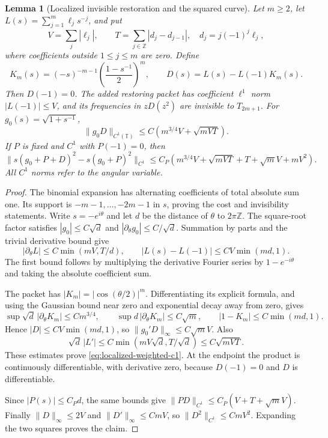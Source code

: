 \documentclass[11pt]{article}
\newtheorem{lemma}[proposition]{Lemma}
\newcommand{\T}{\mathbb T}
\begin{document}
\begin{lemma}[Localized invisible restoration and the squared curve]
\label{lem:localized-restoration}
Let $m\ge2$, let $L(s)=\sum_{j=1}^m\ell_js^{-j}$, and put
\[
 V=\sum_j|\ell_j|,\qquad
 T=\sum_{j\in\mathbb Z}|d_j-d_{j-1}|,
 \quad d_j=j(-1)^j\ell_j,
\]
where coefficients outside $1\le j\le m$ are zero. Define
\[
 K_m(s)=(-s)^{-m-1}\left(\frac{1-s^{-1}}2\right)^m,
 \qquad D(s)=L(s)-L(-1)K_m(s).
\]
Then $D(-1)=0$. The added restoring packet has coefficient
$\ell^1$ norm $|L(-1)|\le V$, and its frequencies in $zD(z^2)$
are invisible to $T_{2m+1}$. For $g_0(s)=\sqrt{1+s^{-1}}$,
\begin{equation}\label{eq:localized-weighted-c1}
 \|g_0D\|_{C^1(\T)}
 \le C\left(m^{3/4}V+\sqrt{mVT}\right).
\end{equation}
If $P$ is fixed and $C^1$ with $P(-1)=0$, then
\[
 \|s(g_0+P+D)^2-s(g_0+P)^2\|_{C^1}
 \le C_P\left(m^{3/4}V+\sqrt{mVT}+T+\sqrt m V+mV^2\right).
\]
All $C^1$ norms refer to the angular variable.
\end{lemma}
\begin{proof}
The binomial expansion has alternating coefficients of total absolute
sum one. Its support is $-m-1,\ldots,-2m-1$ in $s$, proving the
cost and invisibility statements.
Write $s=-e^{i\theta}$ and let $d$ be the distance of $\theta$ to
$2\pi\mathbb Z$. The square-root factor satisfies
$|g_0|\le C\sqrt d$ and $|\partial_\theta g_0|\le C/\sqrt d$.
Summation by parts and the trivial derivative bound give
\[
 |\partial_\theta L|\le C\min(mV,T/d),\qquad
 |L(s)-L(-1)|\le CV\min(md,1).
\]
The first bound follows by multiplying the derivative Fourier series
by $1-e^{-i\theta}$ and taking the absolute coefficient sum.

The packet has $|K_m|=|\cos(\theta/2)|^m$. Differentiating its explicit
formula, and using the Gaussian bound near zero and exponential decay
away from zero, gives
\[
 \sup\sqrt d\,|\partial_\theta K_m|\le Cm^{3/4},\qquad
 \sup d\,|\partial_\theta K_m|\le C\sqrt m,
 \qquad |1-K_m|\le C\min(md,1).
\]
Hence $|D|\le CV\min(md,1)$, so
$\|g_0'D\|_\infty\le C\sqrt m V$. Also
\[
 \sqrt d\,|L'|\le C\min(mV\sqrt d,T/\sqrt d)
                         \le C\sqrt{mVT}.
\]
These estimates prove \eqref{eq:localized-weighted-c1}.
At the endpoint the product is continuously differentiable, with
derivative zero, because $D(-1)=0$ and $D$ is differentiable.

Since $|P(s)|\le C_Pd$, the same bounds give
$\|PD\|_{C^1}\le C_P(V+T+\sqrt m V)$.
Finally $\|D\|_\infty\le2V$ and $\|D'\|_\infty\le CmV$, so
$\|D^2\|_{C^1}\le CmV^2$. Expanding the two squares proves the claim.
\end{proof}
\end{document}
